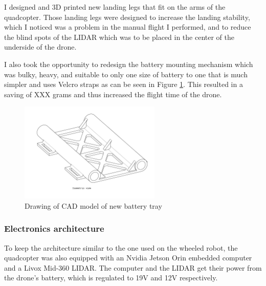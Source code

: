 \documentclass[11pt]{article}
\begin{document}
                I designed and 3D printed new landing legs that fit on the arms of the quadcopter. Those landing legs were designed to increase the landing stability, which I noticed was a problem in the manual flight I performed, and to reduce the blind spots of the LIDAR which was to be placed in the center of the underside of the drone.

                I also took the opportunity to redesign the battery mounting mechanism which was bulky, heavy, and suitable to only one size of battery to one that is much simpler and uses Velcro straps as can be seen in Figure \ref{fig:landing_legs}. This resulted in a saving of \color{red} XXX grams \color{black} and thus increased the flight time of the drone. 
                

                \begin{figure}[H]
                    \centering
                    \includegraphics[width=0.6\textwidth]{Images/BatteryTrayDrawing.pdf}
                    \caption{Drawing of CAD model of new battery tray}
                    \label{fig:landing_legs}
                \end{figure}    
            \subsubsection{Electronics architecture}


                To keep the architecture similar to the one used on the wheeled robot, the quadcopter was also equipped with an Nvidia Jetson Orin embedded computer and a Livox Mid-360 LIDAR. The computer and the LIDAR get their power from the drone's battery, which is regulated to 19V and 12V respectively.
\end{document}
